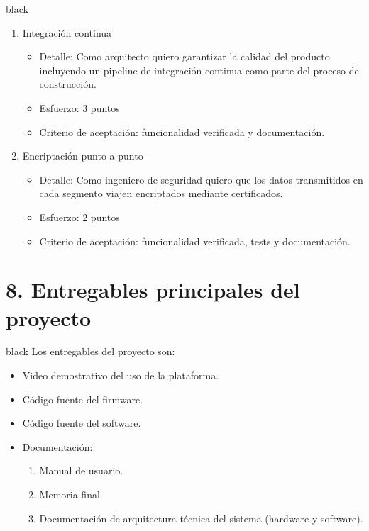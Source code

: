 \documentclass[
11pt, %
]{charter}
\begin{document}
\begin{consigna}{black}
\begin{enumerate}
	\item Integración continua
	\begin{itemize}
		\item Detalle: Como arquitecto quiero garantizar la calidad del producto incluyendo un pipeline de integración continua como parte del proceso de construcción.
		\item Esfuerzo: 3 puntos
		\item Criterio de aceptación: funcionalidad verificada y documentación.
	\end{itemize}

	\item Encriptación punto a punto
	\begin{itemize}
		\item Detalle: Como ingeniero de seguridad quiero que los datos transmitidos en cada segmento viajen encriptados mediante certificados.
		\item Esfuerzo: 2 puntos
		\item Criterio de aceptación: funcionalidad verificada, tests y documentación.
	\end{itemize}
	
\end{enumerate}
\end{consigna}



\section{8. Entregables principales del proyecto}
\label{sec:entregables}
\begin{consigna}{black}
Los entregables del proyecto son:
\begin{itemize}
	\item Video demostrativo del uso de la plataforma. 		
	\item Código fuente del firmware.
	\item Código fuente del software.
	\item Documentación:
	\begin{enumerate}				
		\item Manual de usuario.
		\item Memoria final.
		\item Documentación de arquitectura técnica del sistema (hardware y software).
	\end{enumerate}	
	

\end{itemize}
\end{consigna}
\end{document}
